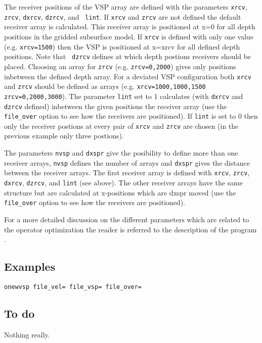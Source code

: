 The receiver positions of the VSP array are defined with the
parameters {\tt xrcv}, {\tt zrcv}, {\tt dxrcv}, {\tt dzrcv}, and {\tt
  lint}. If {\tt xrcv} and {\tt zrcv} are not defined the default
receiver array is calculated. This receiver array is positioned at x=0
for all depth positions in the gridded subsurface model. If {\tt xrcv}
is defined with only one value (e.g. {\tt xrcv=1500}) then the VSP is
positioned at x=xrcv for all defined depth positions. Note that {\tt
  dzrcv} defines at which depth postions receivers should be placed.
Choosing an array for {\tt zrcv} (e.g. {\tt zrcv=0,2000}) gives only
positions inbetween the defined depth array. For a deviated VSP
configuration both {\tt xrcv} and {\tt zrcv} should be defined as
arrays (e.g. {\tt xrcv=1000,1000,1500 zrcv=0,2000,3000}). The
parameter {\tt lint} set to 1 calculates (with {\tt dxrcv} and {\tt
  dzrcv} defined) inbetween the given positions the receiver array
(use the {\tt file\_over} option to see how the receivers are
positioned). If {\tt lint} is set to 0 then only the receiver postions
at every pair of {\tt xrcv} and {\tt zrcv} are chosen (in the previous
example only three postions).

The parameters {\tt nvsp} and {\tt dxspr} give the posibility to
define more than one receiver arrays, {\tt nvsp} defines the number of
arrays and {\tt dxspr} gives the distance between the receiver arrays.
The first receiver array is defined with {\tt xrcv}, {\tt zrcv}, {\tt
  dxrcv}, {\tt dzrcv}, and {\tt lint} (see above). The other receiver
arrays have the same structure but are calculated at x-positions which
are dxspr moved (use the \\ {\tt file\_over} option to see how the
receivers are positioned).

For a more detailed discussion on the different parameters which are
related to the operator optimization the reader is referred to the
description of the program .

\subsection{Examples}

{\footnotesize
\begin{verbatim}onewvsp file_vel= file_vsp= file_over= 
\end{verbatim}}

\subsection{To do}
Nothing really.

